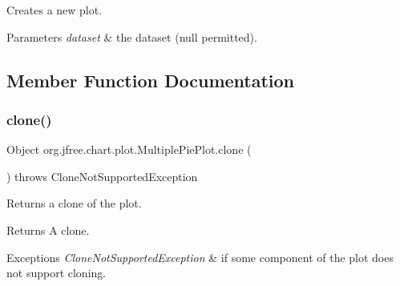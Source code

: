Creates a new plot.


\begin{DoxyParams}{Parameters}
{\em dataset} & the dataset ({\ttfamily null} permitted). \\
\hline
\end{DoxyParams}


\subsection{Member Function Documentation}
\mbox{\label{classorg_1_1jfree_1_1chart_1_1plot_1_1_multiple_pie_plot_a319f0a8902d521bb1c1c92c5e78999ac}} 
\subsubsection{\texorpdfstring{clone()}{clone()}}
{\footnotesize\ttfamily Object org.\+jfree.\+chart.\+plot.\+Multiple\+Pie\+Plot.\+clone (\begin{DoxyParamCaption}{ }\end{DoxyParamCaption}) throws Clone\+Not\+Supported\+Exception}

Returns a clone of the plot.

\begin{DoxyReturn}{Returns}
A clone.
\end{DoxyReturn}

\begin{DoxyExceptions}{Exceptions}
{\em Clone\+Not\+Supported\+Exception} & if some component of the plot does not support cloning. \\
\hline
\end{DoxyExceptions}
\mbox{\label{classorg_1_1jfree_1_1chart_1_1plot_1_1_multiple_pie_plot_a75aa2bbc17f0c7b1d0d388195d870f0d}} 
